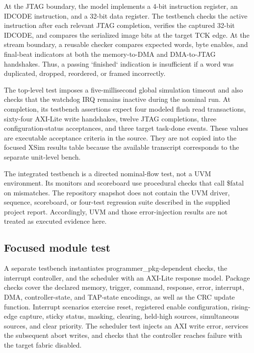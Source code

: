 \documentclass[conference]{IEEEtran}
\begin{document}
At the JTAG boundary, the model implements a 4-bit instruction register, an IDCODE instruction, and a 32-bit data register. The testbench checks the active instruction after each relevant JTAG completion, verifies the captured 32-bit IDCODE, and compares the serialized image bits at the target TCK edge. At the stream boundary, a reusable checker compares expected words, byte enables, and final-beat indicators at both the memory-to-DMA and DMA-to-JTAG handshakes. Thus, a passing `finished` indication is insufficient if a word was duplicated, dropped, reordered, or framed incorrectly.

The top-level test imposes a five-millisecond global simulation timeout and also checks that the watchdog IRQ remains inactive during the nominal run. At completion, its testbench assertions expect four modeled flash read transactions, sixty-four AXI-Lite write handshakes, twelve JTAG completions, three configuration-status acceptances, and three target task-done events. These values are executable acceptance criteria in the source. They are not copied into the focused XSim results table because the available transcript corresponds to the separate unit-level bench.

The integrated testbench is a directed nominal-flow test, not a UVM environment. Its monitors and scoreboard use procedural checks that call \$fatal on mismatches. The repository snapshot does not contain the UVM driver, sequence, scoreboard, or four-test regression suite described in the supplied project report. Accordingly, UVM and those error-injection results are not treated as executed evidence here.

\subsection{Focused module test}

A separate testbench instantiates programmer\_pkg-dependent checks, the interrupt controller, and the scheduler with an AXI-Lite response model. Package checks cover the declared memory, trigger, command, response, error, interrupt, DMA, controller-state, and TAP-state encodings, as well as the CRC update function. Interrupt scenarios exercise reset, registered enable configuration, rising-edge capture, sticky status, masking, clearing, held-high sources, simultaneous sources, and clear priority. The scheduler test injects an AXI write error, services the subsequent abort writes, and checks that the controller reaches failure with the target fabric disabled.
\end{document}
